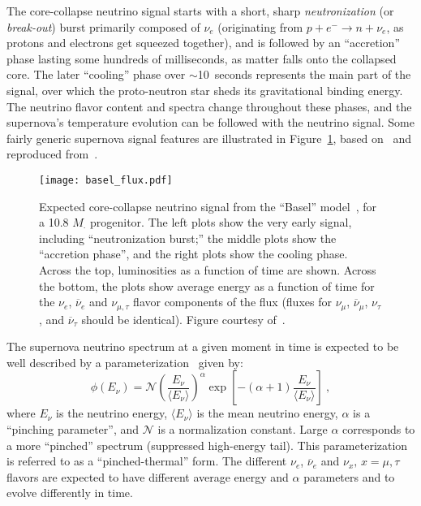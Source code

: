 The core-collapse neutrino signal starts with a short, sharp
\emph{neutronization} (or \emph{break-out}) burst primarily composed of
$\nu_e$ (originating from $p+e^- \rightarrow n + \nu_e$, as protons
and electrons get squeezed together), and is followed by an
``accretion'' phase lasting some hundreds of milliseconds, as matter falls onto the collapsed core.  The later
``cooling'' phase over $\sim$10~seconds represents the main part of
the signal, over which the proto-neutron star sheds its gravitational
binding energy.  The neutrino flavor content and spectra change
throughout these phases, and the supernova's temperature evolution can
be followed with the neutrino signal.
Some fairly generic supernova
signal features are illustrated in Figure~\ref{fig:spectrum}, based on~\cite{Fischer:2009af} and reproduced from~\cite{Wurm:2011zn}.
%
\begin{figure}[!htb]
\centering
\texttt{[image: basel\_flux.pdf]}
\caption[Expected core-collapse neutrino signal]{Expected
  core-collapse neutrino signal from the ``Basel''
  model~\cite{Fischer:2009af}, for a
  10.8 $M_{\cdot}$ progenitor.  The left plots show the very early
  signal, including ``neutronization burst;'' the middle plots show
  the ``accretion phase'', and the right plots show the cooling
  phase. Across the top, luminosities as a function of time are shown. 
  Across the bottom, the plots show average energy as a function of time for the
  $\nu_e$, $\overline{\nu}_e$ and $\nu_{\mu,\tau}$ flavor components of the
  flux (fluxes for $\nu_\mu$, $\overline{\nu}_\mu$, $\nu_\tau$,
  and $\overline{\nu}_\tau$ should be identical).  Figure courtesy of~\cite{Wurm:2011zn}.}
\label{fig:spectrum}
\end{figure}

The supernova neutrino spectrum at a given moment in time is expected
to be well described by a
parameterization~\cite{Minakata:2008nc,Tamborra:2012ac} given by:
\begin{equation}
        \label{eq:pinched}
        \phi(E_{\nu}) = \mathcal{N} 
        \left(\frac{E_{\nu}}{\langle E_{\nu} \rangle}\right)^{\alpha} \exp\left[-\left(\alpha + 1\right)\frac{E_{\nu}}{\langle E_{\nu} \rangle}\right] \ ,
\end{equation}
where $E_{\nu}$ is the neutrino energy, $\langle E_\nu \rangle$ is the
mean neutrino energy, $\alpha$ is a ``pinching parameter'', and
$\mathcal{N}$ is a normalization constant.
%
Large $\alpha$ corresponds to a more ``pinched'' spectrum (suppressed
high-energy tail). This parameterization is referred to as a
``pinched-thermal'' form. The different $\nu_e$, $\overline{\nu}_e$ and
$\nu_x, \, x = \mu, \tau$ flavors are expected to have different
average energy and $\alpha$ parameters and to evolve differently in
time. 


